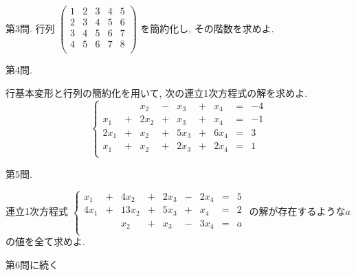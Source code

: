 \documentclass[dvipdfmx,a4paper,11pt]{article}
\theoremstyle{definition}
\begin{document}
 
  \vspace{11pt}
{\Large 第3問.} 
行列
$ \begin{pmatrix}
 1& 2& 3  & 4&5\\
 2& 3& 4  & 5&6\\
 3& 4& 5 & 6&7\\
 4& 5& 6 & 7&8\\
\end{pmatrix}
 $
を簡約化し, その階数を求めよ.

 
  \vspace{11pt}
{\Large 第4問.} 
\vspace{11pt}

行基本変形と行列の簡約化を用いて, 次の連立1次方程式の解を求めよ.
 $$
 \left\{ 
\begin{matrix}
   &  & x_2 &  -& x_3&+ &x_4&= & -4\\
x_1&+&2x_2& +&x_3&+&x_4&= & -1\\
2x_1&+ &x_2& + &5x_3&+&6x_4&=&3 \\
 x_1&+ &x_2& + &2x_3&+&2x_4&=&1 \\
\end{matrix}
\right.
 $$
 
   \vspace{11pt}
{\Large 第5問.} 
\vspace{11pt}

連立1次方程式
 $
 \left\{ 
\begin{matrix}
x_1& +& 4x_2 &  +& 2x_3&- &2x_4&= & 5\\
4x_1&+&13x_2& +&5x_3&+&x_4&= & 2\\
	& &x_2& + &x_3&-&3x_4&=&a \\
\end{matrix}
\right.
 $
 の解が存在するような$a$の値を全て求めよ.
\begin{flushright}
\LARGE{第6問に続く}
\end{flushright}
\end{document}
